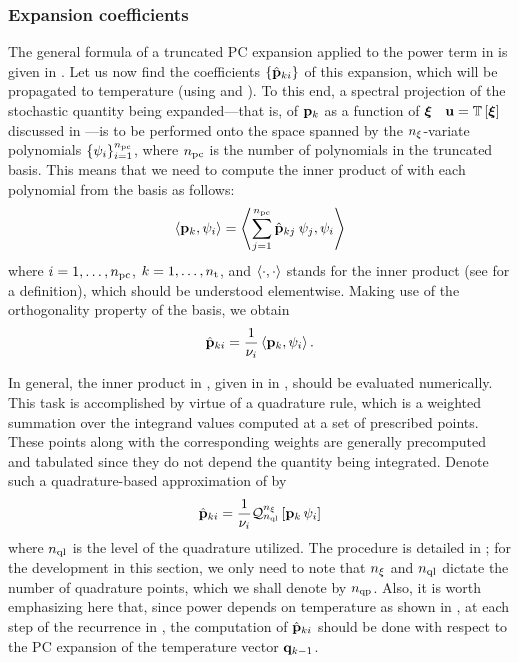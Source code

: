 \subsubsection{Expansion coefficients} 
The general formula of a truncated PC expansion applied to the power term in  is given in .
Let us now find the coefficients $\{ \hat{\mathbf{p}}_{ki} \}$ of this expansion, which will be propagated to temperature (using  and ).
To this end, a spectral projection of the stochastic quantity being expanded---that is, of $\mathbf{p}_k$ as a function of $\boldsymbol{\xi}$ \via\ $\vU = \oTransform{\vZ}$ discussed in ---is to be performed onto the space spanned by the ${n_\xi}$-variate polynomials $\{ \psi_i \}_{i = 1}^{{n_\text{pc}}}$, where ${n_\text{pc}}$ is the number of polynomials in the truncated basis.
This means that we need to compute the inner product of  with each polynomial from the basis as follows:
\[
  \oInner{\vP_k}{\pcb_i} = \oInner{\sum_{j=1}^{\pcterms} \pcc{\vP}_{kj} \: \pcb_j}{\pcb_i}
\]
where $i = 1, \dotsc, {n_\text{pc}}$, $k = 1, \dotsc, {n_\text{t}}$, and $\oInner{\cdot}{\cdot}$ stands for the inner product (see  for a definition), which should be understood elementwise.
Making use of the orthogonality property of the basis, we obtain
\begin{equation} \elabel{pc-coefficients}
  \pcc{\vP}_{ki} = \frac{1}{\pcn_i} \oInner{\vP_k}{\pcb_i}.
\end{equation}

In general, the inner product in , given in  in , should be evaluated numerically.
This task is accomplished by virtue of a quadrature rule, which is a weighted summation over the integrand values computed at a set of prescribed points.
These points along with the corresponding weights are generally precomputed and tabulated since they do not depend the quantity being integrated.
Denote such a quadrature-based approximation of  by
\begin{equation} \elabel{pc-coefficients-quadrature}
  \pcc{\vP}_{ki} = \frac{1}{\pcn_i} \oQuad{\nvars}{\qdlevel}{\vP_k \, \pcb_i}
\end{equation}
where ${n_\text{ql}}$ is the level of the quadrature utilized.
The procedure is detailed in ; for the development in this section, we only need to note that ${n_\xi}$ and ${n_\text{ql}}$ dictate the number of quadrature points, which we shall denote by ${n_\text{qp}}$.
Also, it is worth emphasizing here that, since power depends on temperature as shown in , at each step of the recurrence in , the computation of $\hat{\mathbf{p}}_{ki}$ should be done with respect to the PC expansion of the temperature vector $\mathbf{q}_{k - 1}$.

